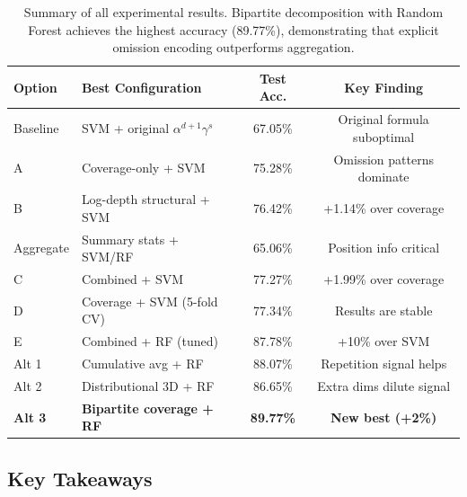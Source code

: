 \documentclass[12pt,a4paper]{article}
\begin{document}
\begin{table}[h]
\centering
\small
\begin{tabular}{llcc}
\hline
\textbf{Option} & \textbf{Best Configuration} & \textbf{Test Acc.} & \textbf{Key Finding} \\
\hline
Baseline & SVM + original $\alpha^{d+1}\gamma^s$ & 67.05\% & Original formula suboptimal \\
A & Coverage-only + SVM & 75.28\% & Omission patterns dominate \\
B & Log-depth structural + SVM & 76.42\% & +1.14\% over coverage \\
Aggregate & Summary stats + SVM/RF & 65.06\% & Position info critical \\
C & Combined + SVM & 77.27\% & +1.99\% over coverage \\
D & Coverage + SVM (5-fold CV) & 77.34\% & Results are stable \\
E & Combined + RF (tuned) & 87.78\% & +10\% over SVM \\
Alt 1 & Cumulative avg + RF & 88.07\% & Repetition signal helps \\
Alt 2 & Distributional 3D + RF & 86.65\% & Extra dims dilute signal \\
\textbf{Alt 3} & \textbf{Bipartite coverage + RF} & \textbf{89.77\%} & \textbf{New best (+2\%)} \\
\hline
\end{tabular}
\caption{Summary of all experimental results. Bipartite decomposition with Random Forest achieves
the highest accuracy (89.77\%), demonstrating that explicit omission encoding outperforms aggregation.}
\label{tab:full_summary}
\end{table}

\subsection{Key Takeaways}
\end{document}
